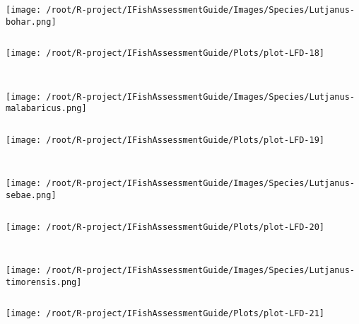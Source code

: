 \begin{knitrout}
\begin{kframe}
\begin{verbatim}
\end{verbatim}
\end{kframe}
\texttt{[image: /root/R-project/IFishAssessmentGuide/Images/Species/Lutjanus-bohar.png]}
\begin{kframe}\begin{verbatim}
\end{verbatim}
\end{kframe}
\texttt{[image: /root/R-project/IFishAssessmentGuide/Plots/plot-LFD-18]} 
\begin{kframe}\begin{verbatim}
 
\end{verbatim}
\end{kframe}
\texttt{[image: /root/R-project/IFishAssessmentGuide/Images/Species/Lutjanus-malabaricus.png]}
\begin{kframe}\begin{verbatim}
\end{verbatim}
\end{kframe}
\texttt{[image: /root/R-project/IFishAssessmentGuide/Plots/plot-LFD-19]} 
\begin{kframe}\begin{verbatim}
 
\end{verbatim}
\end{kframe}
\texttt{[image: /root/R-project/IFishAssessmentGuide/Images/Species/Lutjanus-sebae.png]}
\begin{kframe}\begin{verbatim}
\end{verbatim}
\end{kframe}
\texttt{[image: /root/R-project/IFishAssessmentGuide/Plots/plot-LFD-20]} 
\begin{kframe}\begin{verbatim}
 
\end{verbatim}
\end{kframe}
\texttt{[image: /root/R-project/IFishAssessmentGuide/Images/Species/Lutjanus-timorensis.png]}
\begin{kframe}\begin{verbatim}
\end{verbatim}
\end{kframe}
\texttt{[image: /root/R-project/IFishAssessmentGuide/Plots/plot-LFD-21]} 
\begin{kframe}\begin{verbatim}
 

\end{verbatim}
\end{kframe}
\end{knitrout}

